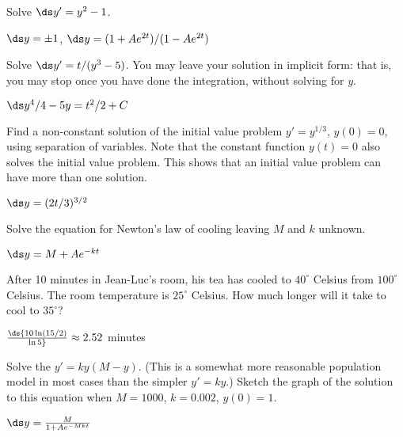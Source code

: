 \begin{enumialphparenastyle}
\begin{ex}
 Solve $\ds y' = y^2 -1$.
\begin{sol}
 $\ds y=\pm 1$, $\ds y=(1+Ae^{2t})/(1-Ae^{2t})$
\end{sol}
\end{ex}

\begin{ex}
 Solve $\ds y' = t/(y^3 - 5)$. You may leave
your solution in implicit form: that is, you may stop once you have
done the integration, without solving for $y$.
\begin{sol}
 $\ds y^4/4-5y=t^2/2+C$
\end{sol}
\end{ex}

\begin{ex}
 Find a non-constant solution of the initial value problem 
$y' = y^{1/3}$, $y(0)=0$, using
 separation of variables. Note that the constant function $y(t)=0 $
 also solves the initial value problem. This shows that an initial value
 problem can have more than one solution.
\begin{sol}
 $\ds y=(2t/3)^{3/2}$
\end{sol}
\end{ex}

\begin{ex}
 Solve the equation for Newton's law of cooling leaving $M$
and $k$ unknown.
\begin{sol}
 $\ds y=M+Ae^{-kt}$
\end{sol}
\end{ex}


\begin{ex}
 After 10 minutes in Jean-Luc's room, his tea has
cooled to $40^\circ $ Celsius from $100^\circ$ Celsius. 
The room temperature is $25^\circ$
Celsius. How much longer will it take to cool to $35^\circ$?
\begin{sol}
 $\ds {10\ln(15/2)\over\ln 5}\approx 2.52$ minutes
\end{sol}
\end{ex} 


\begin{ex}
 Solve the  $y' = ky(M-y)$. (This is a somewhat more
reasonable population model in most cases than the simpler
$y'=ky$.) Sketch the
graph of the solution to this equation when 
$M=1000$, $k=0.002$, $y(0)=1$.
\begin{sol}
 $\ds y={M\over 1+Ae^{-Mkt}}$
\end{sol}
\end{ex}



\end{enumialphparenastyle}
